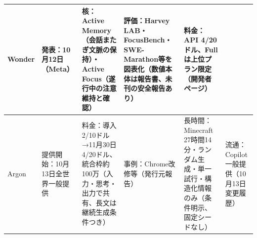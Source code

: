 \documentclass[lualatex,a4paper,10pt]{jlreq}
\begin{document}
{\centering\footnotesize
{}
\begin{tabularx}{0.96\linewidth}{@{}lXXXXX@{}}
\toprule
Wonder & 発表：10月12日（Meta） & 核：Active Memory（会話またぎ文脈の保持）・Active Focus（遂行中の注意維持と確認） & 評価：Harvey LAB・FocusBench・SWE-Marathon等を図表化（数値本体は報告書、未刊の安全報告あり） & 料金：API 4/20ドル、Fullは上位プラン限定（開発者ページ） \cite{B01,B62,B63,B02} \\
\midrule
Argon & 提供開始：10月13日全世界一般提供 & 料金：導入2/10ドル→11月30日4/20ドル、統合枠約100万（入力・思考・出力で共有、長文は継続生成条件つき） & 事例：Chrome改修等（発行元報告） & 長時間：Minecraft 27時間14分・ランダム生成・単一試行・構造化情報のみ（条件明示、固定シードなし） & 流通：Copilot一般提供（10月13日変更履歴） \cite{B05,B65,B08,B04} \\
\bottomrule
\end{tabularx}
} %
\end{document}
